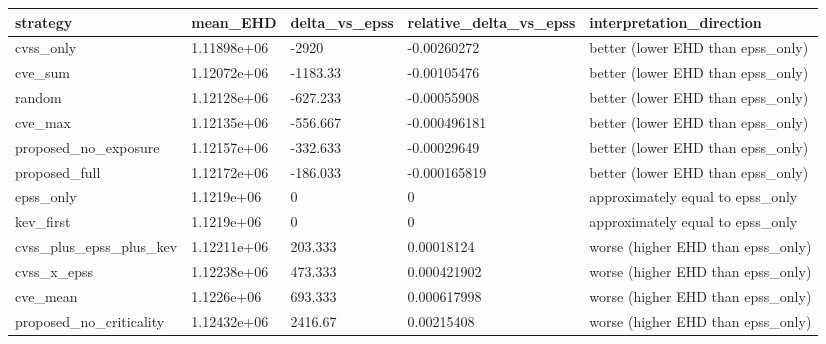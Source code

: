 \begin{tabular}{l l l l l}
\hline
strategy & mean\_EHD & delta\_vs\_epss & relative\_delta\_vs\_epss & interpretation\_direction \\
\hline
cvss\_only & 1.11898e+06 & -2920 & -0.00260272 & better (lower EHD than epss\_only) \\
cve\_sum & 1.12072e+06 & -1183.33 & -0.00105476 & better (lower EHD than epss\_only) \\
random & 1.12128e+06 & -627.233 & -0.00055908 & better (lower EHD than epss\_only) \\
cve\_max & 1.12135e+06 & -556.667 & -0.000496181 & better (lower EHD than epss\_only) \\
proposed\_no\_exposure & 1.12157e+06 & -332.633 & -0.00029649 & better (lower EHD than epss\_only) \\
proposed\_full & 1.12172e+06 & -186.033 & -0.000165819 & better (lower EHD than epss\_only) \\
epss\_only & 1.1219e+06 & 0 & 0 & approximately equal to epss\_only \\
kev\_first & 1.1219e+06 & 0 & 0 & approximately equal to epss\_only \\
cvss\_plus\_epss\_plus\_kev & 1.12211e+06 & 203.333 & 0.00018124 & worse (higher EHD than epss\_only) \\
cvss\_x\_epss & 1.12238e+06 & 473.333 & 0.000421902 & worse (higher EHD than epss\_only) \\
cve\_mean & 1.1226e+06 & 693.333 & 0.000617998 & worse (higher EHD than epss\_only) \\
proposed\_no\_criticality & 1.12432e+06 & 2416.67 & 0.00215408 & worse (higher EHD than epss\_only) \\
\hline
\end{tabular}
